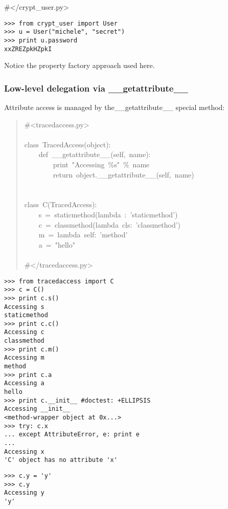 \documentclass[10pt,a4paper,english]{article}
\begin{document}
{\#}{\textless}/crypt{\_}user.py{\textgreater}
\begin{verbatim}>>> from crypt_user import User
>>> u = User("michele", "secret")
>>> print u.password
xxZREZpkHZpkI\end{verbatim}

Notice the property factory approach used here.



\hypertarget{low-level-delegation-via-getattribute}{}
\subsubsection*{Low-level delegation via {\_}{\_}getattribute{\_}{\_}}

Attribute access is managed by the{\_}{\_}getattribute{\_}{\_} special method:
\begin{quote}{\ttfamily \raggedright \noindent
{\#}<tracedaccess.py>~\\
~\\
class~TracedAccess(object):~\\
~~~~def~{\_}{\_}getattribute{\_}{\_}(self,~name):~\\
~~~~~~~~print~"Accessing~{\%}s"~{\%}~name~\\
~~~~~~~~return~object.{\_}{\_}getattribute{\_}{\_}(self,~name)~\\
~\\
~\\
class~C(TracedAccess):~\\
~~~~s~=~staticmethod(lambda~:~'staticmethod')~\\
~~~~c~=~classmethod(lambda~cls:~'classmethod')~\\
~~~~m~=~lambda~self:~'method'~\\
~~~~a~=~"hello"~\\
~\\
{\#}</tracedaccess.py>
}\end{quote}
\begin{verbatim}>>> from tracedaccess import C
>>> c = C()
>>> print c.s()
Accessing s
staticmethod
>>> print c.c()
Accessing c
classmethod
>>> print c.m()
Accessing m
method
>>> print c.a
Accessing a
hello
>>> print c.__init__ #doctest: +ELLIPSIS
Accessing __init__
<method-wrapper object at 0x...>
>>> try: c.x
... except AttributeError, e: print e
...
Accessing x
'C' object has no attribute 'x'\end{verbatim}
\begin{verbatim}>>> c.y = 'y'
>>> c.y
Accessing y
'y'\end{verbatim}
\end{document}
